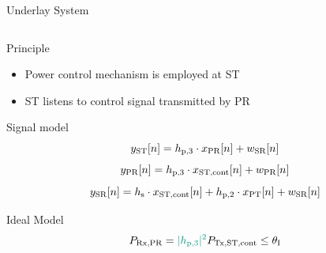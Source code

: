 \documentclass[16pt]{beamer}
\newcommand{\fs}[2]{\fontsize{#1 pt}{#2}\selectfont}
\begin{document}
\begin{frame}[t]{Underlay System}
	\vspace{-4mm}
	\fs{7}{8}
	\begin{columns}
		\begin{column}{0.44\columnwidth}
			\begin{block}{\scriptsize Principle} %
				\begin{itemize}
					\item Power control mechanism is employed at ST 
					\item ST listens to control signal transmitted by PR 
				\end{itemize}
			\end{block}
			\vspace{2mm}
			{
				\begin{block}{\scriptsize Signal model} %
				\begin{equation*}
					y_{\text{ST}}[n] = h_{\text{p,3}} \cdot x_{\text{PR}}[n] + w_{\text{SR}}[n]
				\end{equation*}
				\begin{equation*}
					y_{\text{PR}}[n] = h_{\text{p,3}}  \cdot x_{\text{ST,cont}}[n] + w_{\text{PR}}[n]
				\end{equation*}
				\begin{equation*}
					y_{\text{SR}}[n] = h_{\text{s}} \cdot x_{\text{ST,cont}}[n] + h_{\text{p,2}} \cdot x_{\text{PT}}[n] + w_{\text{SR}}[n]
				\end{equation*}
				\end{block}
				\vspace{2mm}
				\begin{block}{\scriptsize Ideal Model} 
				\begin{equation*}
					\prcvdpr = {\color{kit-green100}{\phpth}} \preg \le \ite
				\end{equation*}	
				\begin{equation*}

\end{equation*}
\end{block}}
\end{column}
\end{columns}
\end{frame}
\end{document}
